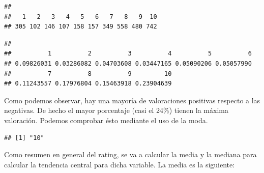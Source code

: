 \documentclass[spanish,]{article}
\newenvironment{Shaded}{\begin{snugshade}}{\end{snugshade}}
\newcommand{\KeywordTok}[1]{\textcolor[rgb]{0.13,0.29,0.53}{\textbf{#1}}}
\newcommand{\DecValTok}[1]{\textcolor[rgb]{0.00,0.00,0.81}{#1}}
\newcommand{\StringTok}[1]{\textcolor[rgb]{0.31,0.60,0.02}{#1}}
\newcommand{\CommentTok}[1]{\textcolor[rgb]{0.56,0.35,0.01}{\textit{#1}}}
\newcommand{\ControlFlowTok}[1]{\textcolor[rgb]{0.13,0.29,0.53}{\textbf{#1}}}
\newcommand{\OperatorTok}[1]{\textcolor[rgb]{0.81,0.36,0.00}{\textbf{#1}}}
\newcommand{\NormalTok}[1]{#1}
\begin{document}
\begin{verbatim}
## 
##   1   2   3   4   5   6   7   8   9  10 
## 305 102 146 107 158 157 349 558 480 742
\end{verbatim}

\begin{Shaded}
\end{Shaded}

\begin{verbatim}
## 
##          1          2          3          4          5          6 
## 0.09826031 0.03286082 0.04703608 0.03447165 0.05090206 0.05057990 
##          7          8          9         10 
## 0.11243557 0.17976804 0.15463918 0.23904639
\end{verbatim}

Como podemos observar, hay una mayoría de valoraciones positivas
respecto a las negativas. De hecho el mayor porcentaje (casi el 24\%)
tienen la máxima valoración. Podemos comprobar ésto mediante el uso de
la moda.

\begin{Shaded}
\end{Shaded}

\begin{verbatim}
## [1] "10"
\end{verbatim}

Como resumen en general del rating, se va a calcular la media y la
mediana para calcular la tendencia central para dicha variable. La media
es la siguiente:
\end{document}
